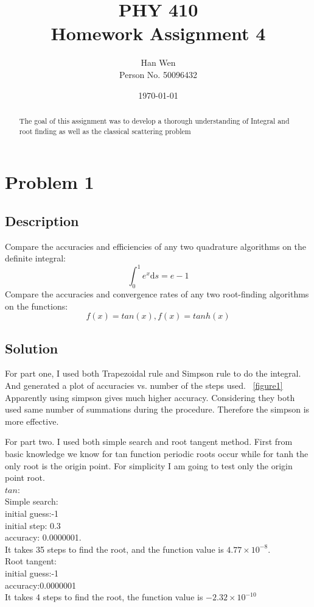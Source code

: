 \documentclass[11pt,letterpaper]{article}
\begin{document}
\title{PHY 410 \\ Homework Assignment 4}
\author{Han Wen \\ \tiny Person No. 50096432}
\date{\today}

\maketitle

\begin{abstract}
The goal of this assignment was to develop a thorough understanding of Integral and root finding as well as the classical scattering problem
\end{abstract}

\tableofcontents

\newpage
\section{Problem 1}

\subsection{Description}
Compare the accuracies and efficiencies of any two quadrature algorithms on the definite integral:
$$
\int_0^1 e^x\mathrm{d}s=e-1
$$
Compare the accuracies and convergence rates of any two root-finding algorithms on the functions:
$$
f(x)=tan(x),   f(x)=tanh(x)
$$



\subsection{Solution}
For part one, I used both Trapezoidal rule and Simpson rule to do the integral. And generated a plot of accuracies vs. number of the steps used. ~\ref{figure1}
Apparently using simpson gives much higher accuracy. Considering they both used same number of summations during the procedure. Therefore the simpson is more effective. 


For part two. I used both simple search and root tangent method. First from basic knowledge we know for tan function periodic roots occur while for tanh the only root is the origin point. For simplicity I am going to test only the origin point root.\\
$tan$:\\
	Simple search:\\		initial guess:-1\\		initial step: 0.3 \\		accuracy: 0.0000001.\\
	It takes 35 steps to find the root, and the function value is $4.77\times10^{-8}$.
	\\
	Root tangent:\\		initial guess:-1\\		accuracy:0.0000001\\
	It takes 4 steps to find the root, the function value is $-2.32\times10^{-10}$\\
\end{document}
